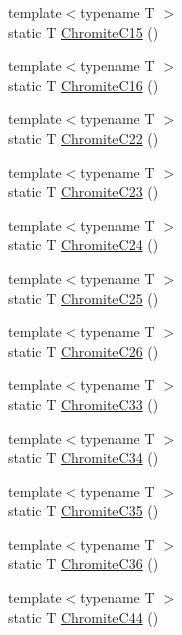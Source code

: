 \begin{DoxyCompactItemize}
{\footnotesize template$<$typename T $>$ }\\static T \mbox{\hyperlink{namespacempc_1_1data_a2731ef451f98fdc6121765dab7d7c020}{Chromite\+C15}} ()
\item 
{\footnotesize template$<$typename T $>$ }\\static T \mbox{\hyperlink{namespacempc_1_1data_ae6c1a1548eee6581395044867777aeee}{Chromite\+C16}} ()
\item 
{\footnotesize template$<$typename T $>$ }\\static T \mbox{\hyperlink{namespacempc_1_1data_a2c033c84843347ee5e6a36fc326abcec}{Chromite\+C22}} ()
\item 
{\footnotesize template$<$typename T $>$ }\\static T \mbox{\hyperlink{namespacempc_1_1data_a4fdd18b16465a41024a5645aad65c25b}{Chromite\+C23}} ()
\item 
{\footnotesize template$<$typename T $>$ }\\static T \mbox{\hyperlink{namespacempc_1_1data_affe2cfeb4ec1cb7cbd4b7eb552a91521}{Chromite\+C24}} ()
\item 
{\footnotesize template$<$typename T $>$ }\\static T \mbox{\hyperlink{namespacempc_1_1data_a1464d8fe48384d63e0283f92b64103c6}{Chromite\+C25}} ()
\item 
{\footnotesize template$<$typename T $>$ }\\static T \mbox{\hyperlink{namespacempc_1_1data_a688d688d1a2a0992174a2cf65faea24d}{Chromite\+C26}} ()
\item 
{\footnotesize template$<$typename T $>$ }\\static T \mbox{\hyperlink{namespacempc_1_1data_a84fdca434fb3cd2bd76c5eec260e692e}{Chromite\+C33}} ()
\item 
{\footnotesize template$<$typename T $>$ }\\static T \mbox{\hyperlink{namespacempc_1_1data_ad58444aaa7d5b45dbc5e1dfc146a07a9}{Chromite\+C34}} ()
\item 
{\footnotesize template$<$typename T $>$ }\\static T \mbox{\hyperlink{namespacempc_1_1data_a0a6c5514d8208809899642d97cc565d3}{Chromite\+C35}} ()
\item 
{\footnotesize template$<$typename T $>$ }\\static T \mbox{\hyperlink{namespacempc_1_1data_adb9aaa7c25dbad6e1b756442a889c57c}{Chromite\+C36}} ()
\item 
{\footnotesize template$<$typename T $>$ }\\static T \mbox{\hyperlink{namespacempc_1_1data_aacd8061639b165b77a2e3523a4b2232a}{Chromite\+C44}} ()

\end{DoxyCompactItemize}
